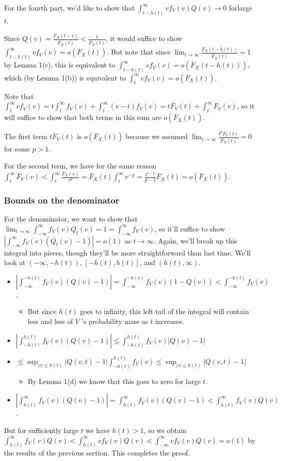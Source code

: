 \documentclass[../main.tex]{subfiles}
\begin{document}
For the fourth part, we'd like to show that \(\int_{t-h(t)}^\infty vf_V(v)Q(v) \to 0\) forlarge \(t\).

Since \(Q(v)=\frac{\bar F_X(t-v)}{\bar F_X(t)} < \frac 1{\bar F_X(t)}\), it would suffice to show \(\int_{t-h(t)}^\infty vf_V(v) = o(\bar F_X(t))\). But note that since \(\lim_{t\to\infty}\frac{\bar F_X(t-h(t))}{\bar F_X(t)} = 1\) by Lemma 1(c), this is equivalent to \(\int_{t-h(t)}^\infty vf_V(v) = o(\bar F_X(t-h(t)))\), which (by Lemma 1(b)) is equivalent to \(\int_t^\infty vf_V(v) = o(\bar F_X(t))\).

Note that \(\int_{t}^\infty vf_V(v) = t\int_{t}^\infty f_V(v) + \int_{t}^\infty (v-t)f_V(v) = t\bar F_V(t)+\int_{t}^\infty \bar F_V(v)\), so it will suffice to show that both terms in this sum are \(o(\bar F_X(t))\). 

The first term \(t \bar F_V(t)\) is \(o(\bar F_X(t))\) because we assumed \(\lim_{t\to\infty} \frac{t^p\bar F_V(t)}{\bar F_X(t)}=0\) for some \(p>1\).

For the second term, we have for the same reason \(\int_t^\infty \bar F_V(v) < \int_t^\infty \frac{\bar F_X(v)}{v^p} = \bar F_X(t)\int_t^\infty v^{-p} = \frac{t^{1-p}}{p-1}\bar F_X(t) = o(\bar F_X(t))\).

\subsubsection{Bounds on the denominator}

For the denominator, we want to show that \(\lim_{t\to\infty}\int_{-\infty}^\infty f_V(v)Q_t(v)=1=\int_{-\infty}^\infty f_V(v)\), so it'll suffice to show \(|\int_{-\infty}^\infty f_V(v)(Q_t(v)-1)|=o(1)\) as \(t\to\infty\). Again, we'll break up this integral into pieces, though they'll be more straightforward than last time. We'll look at \((-\infty,-h(t))\), \([-h(t),h(t)]\), and \((h(t),\infty)\).

\begin{itemize}
    \item \(|\int_{-\infty}^{-h(t)}f_V(v)(Q(v)-1)|=\int_{-\infty}^{-h(t)}f_V(v)(1-Q(v))<\int_{-\infty}^{-h(t)}f_V(v)\).
    \begin{itemize}
        \item But since \(h(t)\) goes to infinity, this left tail of the integral will contain less and less of \(V\) 's probability mass as $t$ increases.
    \end{itemize}
    \item \(|\int_{-h(t)}^{h(t)}f_V(v)(Q(v)-1)|\le\int_{-h(t)}^{h(t)}f_V(v)|Q(v)-1|\)
    \item \(\le \sup_{|v| \le h(t)} |Q(v,t)-1|\int_{-h(t)}^{h(t)}f_V(v)\le \sup_{|v| \le h(t)} |Q(v,t)-1|\)
    \begin{itemize}
        \item By Lemma 1(d) we know that this goes to zero for large \(t\).
    \end{itemize}
    \item \(|\int_{h(t)}^\infty f_V(v)(Q(v)-1)| = \int_{h(t)}^\infty f_V(v)(Q(v)-1) < \int_{h(t)}^\infty f_V(v)Q(v)\).
\end{itemize}

But for sufficiently large \(t\) we have \(h(t)>1\), so we obtain
 \(\int_{h(t)}^\infty f_V(v)Q(v)<\int_{h(t)}^\infty v f_V(v)Q(v) < \int_{-\infty}^\infty v f_V(v)Q(v) = o(1)\) 
by the results of the previous section. This completes the proof.
\end{document}
